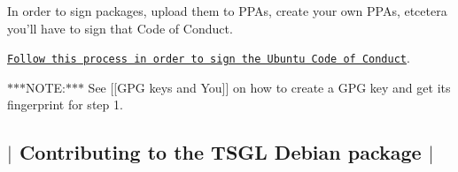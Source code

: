 In order to sign packages, upload them to P\-P\-As, create your own P\-P\-As, etcetera you'll have to sign that Code of Conduct.

\href{https://launchpad.net/codeofconduct}{\tt Follow this process in order to sign the Ubuntu Code of Conduct}.

$\ast$$\ast$$\ast$\-N\-O\-T\-E\-:$\ast$$\ast$$\ast$ See \mbox{[}\mbox{[}G\-P\-G keys and You\mbox{]}\mbox{]} on how to create a G\-P\-G key and get its fingerprint for step 1. 

 \subsection*{$\vert$ Contributing to the T\-S\-G\-L Debian package $\vert$ }